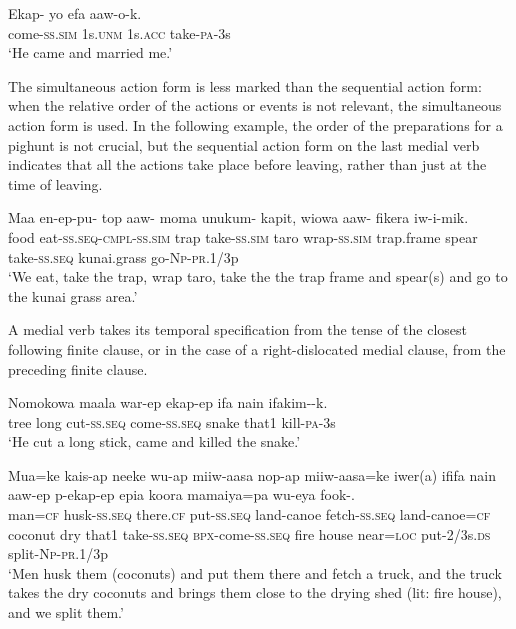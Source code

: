 \ea%
\label{ex:x1433}
\gll Ekap-  yo  efa  aaw-o-k. \\
come-\textsc{ss}.\textsc{sim} 1s.\textsc{unm} 1s.\textsc{acc} take-\textsc{pa}-3s\\
\glt`He came and married me.'
\z


The simultaneous action form is less marked than the sequential action form: when the relative order of the actions or events is not relevant, the simultaneous action form is used. In the following example, the order of the preparations for a pighunt is not crucial, but the sequential action form on the last medial verb indicates that all the actions take place before leaving, rather than just at the time of leaving.  

\ea%
\label{ex:x1437}
\gll Maa  en-ep-pu-  top  aaw-  moma unukum-  kapit,  wiowa  aaw-  fikera iw-i-mik.\\
food  eat-\textsc{ss}.\textsc{seq}-\textsc{cmpl}-\textsc{ss}.\textsc{sim} trap take-\textsc{ss}.\textsc{sim} taro wrap-\textsc{ss}.\textsc{sim} trap.frame spear take-\textsc{ss}.\textsc{seq} kunai.grass go-\textsc{Np}-\textsc{pr}.1/3p\\
\glt`We eat, take the trap, wrap taro, take the the trap frame and spear(s) and go to the kunai grass area.'
\z


A medial verb takes its temporal specification from the tense of the closest following finite clause, or in the case of a right-dislocated medial clause, from the preceding finite clause.

\ea%
\label{ex:x1442}
\gll Nomokowa  maala  war-ep    ekap-ep  ifa  nain  ifakim--k.\\
tree  long  cut-\textsc{ss}.\textsc{seq} come-\textsc{ss}.\textsc{seq} snake that1 kill-\textsc{pa}-3s\\
\glt`He cut a long stick, came and killed the snake.'
\z


\ea%
\label{ex:x1444}
\gll Mua=ke  kais-ap  neeke  wu-ap  miiw-aasa  nop-ap miiw-aasa=ke  iwer(a)  ififa  nain  aaw-ep  p-ekap-ep epia  koora  mamaiya=pa  wu-eya  fook-.\\
man=\textsc{cf} husk-\textsc{ss}.\textsc{seq} there.\textsc{cf} put-\textsc{ss}.\textsc{seq} land-canoe fetch-\textsc{ss}.\textsc{seq} land-canoe=\textsc{cf} coconut dry that1 take-\textsc{ss}.\textsc{seq} \textsc{\textsc{bp}x}-come-\textsc{ss}.\textsc{seq} fire house near=\textsc{loc} put-2/3s.\textsc{ds} split-\textsc{Np}-\textsc{pr}.1/3p\\
\glt`Men husk them (coconuts) and put them there and fetch a truck, and the truck takes the dry coconuts and brings them close to the drying shed (lit: fire house), and we split them.'
\z


